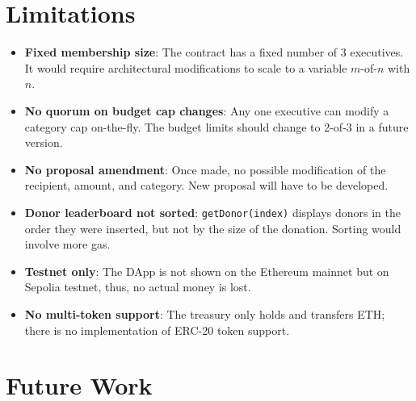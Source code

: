 \documentclass[12pt,a4paper]{article}
\begin{document}
\section{Limitations}

\begin{itemize}
  \item \textbf{Fixed membership size}: The contract has a fixed number of 3 executives. It would require architectural modifications to scale to a variable $m$-of-$n$ with $n$.
  \item \textbf{No quorum on budget cap changes}: Any one executive can modify a category cap on-the-fly. The budget limits should change to 2-of-3 in a future version.
  \item \textbf{No proposal amendment}: Once made, no possible modification of the recipient, amount, and category. New proposal will have to be developed.
  \item \textbf{Donor leaderboard not sorted}: \texttt{getDonor(index)} displays donors in the order they were inserted, but not by the size of the donation. Sorting would involve more gas.
  \item \textbf{Testnet only}:  The DApp is not shown on the Ethereum mainnet but on Sepolia testnet, thus, no actual money is lost.
  \item \textbf{No multi-token support}: The treasury only holds and transfers ETH; there is no implementation of ERC-20 token support.
\end{itemize}

\section{Future Work}
\end{document}
